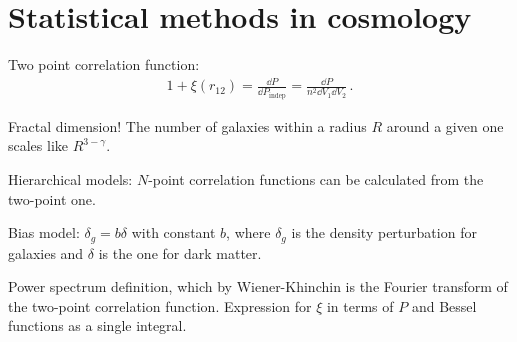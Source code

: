 \documentclass[main.tex]{subfiles}
\begin{document}
\section{Statistical methods in cosmology}



Two point correlation function: 
%
\begin{align}
1 + \xi (r_{12} ) = \frac{ \dd{P}}{ \dd{P} _{\text{indep}}} = \frac{ \dd{P}}{ n^2 \dd{V_1} \dd{V_2}}
\,.
\end{align}
%

Fractal dimension! 
The number of galaxies within a radius \(R\) around a given one scales like \(R^{3-\gamma }\).

Hierarchical models: \(N\)-point correlation functions can be calculated from the two-point one. 

Bias model: \(\delta _g = b \delta \) with constant \(b\), where \(\delta_g \) is the density perturbation for galaxies and \(\delta \) is the one for dark matter.

Power spectrum definition, which by Wiener-Khinchin is the Fourier transform of the two-point correlation function. 
Expression for \(\xi \) in terms of \(P\) and Bessel functions as a single integral. 
\end{document}
